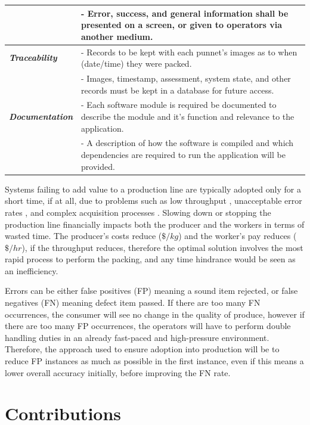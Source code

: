 \documentclass[fleqn,twoside,12pt]{report}
\begin{document}
\begin{longtable}{p{2.5cm}p{12cm}}
	& - Error, success, and general information shall be presented on a screen, or given to operators via another medium.  \\[2pt]
	\hline
	\textbf{\textit{Traceability}}		& - Records to be kept with each punnet's images as to when (date/time) they were packed.  \\[4pt]
	& - Images, timestamp, assessment, system state, and other records must be kept in a database for future access. \\[2pt]
	\hline
	\textbf{\textit{Documentation}}	& - Each software module is required be documented to describe the module and it's function and relevance to the application.  \\[4pt]
	& - A description of how the software is compiled and which dependencies are required to run the application will be provided. \\[2pt]
	\hline
\end{longtable}


Systems failing to add value to a production line are typically adopted only for a short time, if at all, due to problems such as low throughput \cite{brosnan, liming}, unacceptable error rates \cite{matteoli, elmasry2}, and complex acquisition processes \cite{liu2, chiu}. Slowing down or stopping the production line financially impacts both the producer and the workers in terms of wasted time. The producer's costs reduce ($\$/kg$) and the worker's pay reduces ($\$/hr$), if the throughput reduces, therefore the optimal solution involves the most rapid process to perform the packing, and any time hindrance would be seen as an inefficiency. 

Errors can be either false positives (FP) meaning a sound item rejected, or false negatives (FN) meaning defect item passed. If there are too many FN occurrences, the consumer will see no change in the quality of produce, however if there are too many FP occurrences, the operators will have to perform double handling duties in an already fast-paced and high-pressure environment. Therefore, the approach used to ensure adoption into production will be to reduce FP instances as much as possible in the first instance, even if this means a lower overall accuracy initially, before improving the FN rate.  



\section{Contributions}
\end{document}
